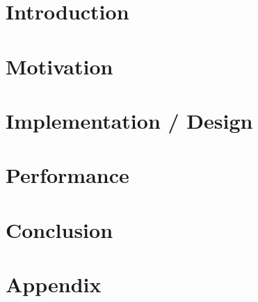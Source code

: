 \documentclass[11pt,a4paper]{book}
\begin{document}
\nocite{*}

\frontmatter


\chapter*{Introduction}
\label{s:Introduction}



\tableofcontents

\mainmatter
\chapter{Motivation}
\label{s:motivation}


\chapter{Implementation / Design}
\label{s:implementation}


\chapter{Performance}
\label{s:performance}


\chapter{Conclusion}
\label{s:conclusion}

\appendix
\chapter{Appendix}
\label{s:appendix}



\end{document}
